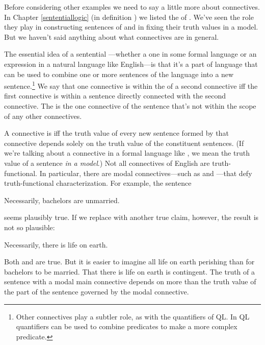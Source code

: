 Before considering other examples we need to say a little more about connectives. 
In Chapter \ref{sententiallogic} (in definition ) we listed the  of \GSL{}.
We've seen the role they play in constructing sentences of \GSL{} and in fixing their truth values in a model. 
But we haven't said anything about what connectives are in general. 

The essential idea of a sentential ---whether a  one in some formal language or an expression in a natural language like English---is that it's a part of language that can be used to combine one or more sentences of the language into a new sentence.\footnote{Other connectives play a subtler role, as with the quantifiers of QL.
In QL quantifiers can be used to combine predicates to make a more complex predicate.} 
We say that one connective is within the  of a second connective iff the first connective is within a sentence directly connected with the second connective.
The  is the one connective of the sentence that's not within the scope of any other connectives. 

A connective is  iff the truth value of every new sentence formed by that connective depends solely on the truth value of the constituent sentences. 
(If we're talking about a connective in a formal language like \GSL{}, we mean the truth value of a sentence \emph{in a model}.)
Not all connectives of English are truth-functional.
In particular, there are modal connectives---such as  and ---that defy truth-functional characterization.
For example, the sentence

\begin{menumerate}
	\item Necessarily, bachelors are unmarried.
\end{menumerate}

\noindent{}seems plausibly true.  If we replace  with another true claim, however, the result is not so plausible:

\begin{menumerate}
	\item Necessarily, there is life on earth.
\end{menumerate}

\noindent{}Both  and  are true.
But it is easier to imagine all life on earth perishing than for bachelors to be married.
That there is life on earth is contingent.
The truth of a sentence with a modal main connective depends on more than the truth value of the part of the sentence governed by the modal connective.  

